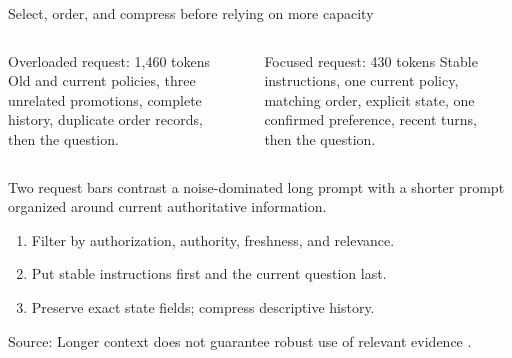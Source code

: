 \documentclass[aspectratio=169]{beamer}
\newcommand{\slidesource}[1]{\par\vfill\noindent\parbox{\linewidth}{\tiny\color{hrgray}\raggedright\sloppy Source: #1}}
\newcommand{\visualdescription}[1]{\par\vspace{.2em}\noindent\parbox{\linewidth}{\centering\tiny\color{hrgray}#1}}
\begin{document}
\begin{frame}{Select, order, and compress before relying on more capacity}
\footnotesize
\begin{columns}[T]
\begin{minipage}[t][24mm][t]{\linewidth}
\begin{alertblock}{Overloaded request: 1,460 tokens}
Old and current policies, three unrelated promotions, complete history, duplicate order records, then the question.
\end{alertblock}
\end{minipage}
\begin{center}
\end{center}
\begin{minipage}[t][24mm][t]{\linewidth}
\begin{block}{Focused request: 430 tokens}
Stable instructions, one current policy, matching order, explicit state, one confirmed preference, recent turns, then the question.
\end{block}
\end{minipage}
\begin{center}
\end{center}
\end{columns}
\visualdescription{Two request bars contrast a noise-dominated long prompt with a shorter prompt organized around current authoritative information.}
\vspace{.5em}
\begin{enumerate}\itemsep1pt
  \item Filter by authorization, authority, freshness, and relevance.
  \item Put stable instructions first and the current question last.
  \item Preserve exact state fields; compress descriptive history.
\end{enumerate}
\slidesource{Longer context does not guarantee robust use of relevant evidence \parencite{Liu2024LostMiddle,Shi2023DistractedIrrelevantContext}.}
\end{frame}
\end{document}

